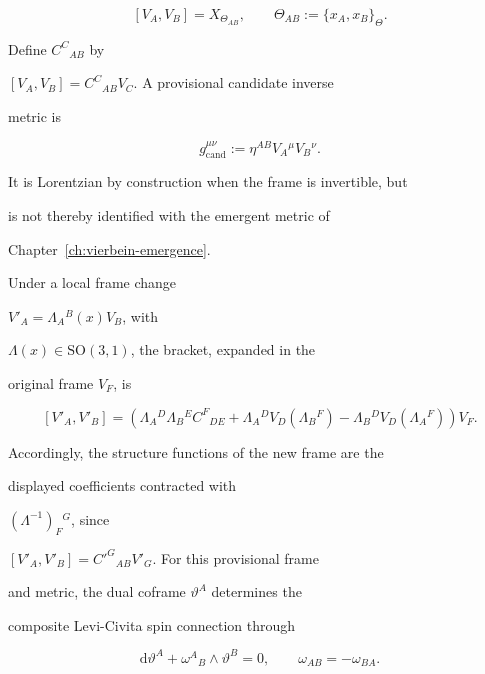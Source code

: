 \[

  [V_A,V_B]=X_{\Theta_{AB}},

  \qquad

  \Theta_{AB}:=\{x_A,x_B\}_\Theta .

\]

Define \(C^C{}_{AB}\) by

\([V_A,V_B]=C^C{}_{AB}V_C\). A provisional candidate inverse

metric is

\[

  g_{\mathrm{cand}}^{\mu\nu}

  :=\eta^{AB}V_A{}^\mu V_B{}^\nu .

\]

It is Lorentzian by construction when the frame is invertible, but

is not thereby identified with the emergent metric of

Chapter~\ref{ch:vierbein-emergence}.



Under a local frame change

\(V'_A=\Lambda_A{}^B(x)V_B\), with

\(\Lambda(x)\in\mathrm{SO}(3,1)\), the bracket, expanded in the

original frame \(V_F\), is

\[

  [V'_A,V'_B]

  =

  \left(

    \Lambda_A{}^D\Lambda_B{}^E C^F{}_{DE}

    +\Lambda_A{}^D V_D(\Lambda_B{}^F)

    -\Lambda_B{}^D V_D(\Lambda_A{}^F)

  \right)V_F .

\]

Accordingly, the structure functions of the new frame are the

displayed coefficients contracted with

\((\Lambda^{-1})_F{}^G\), since

\([V'_A,V'_B]=C'^G{}_{AB}V'_G\). For this provisional frame

and metric, the dual coframe \(\vartheta^A\) determines the

composite Levi-Civita spin connection through

\[

  \mathrm{d}\vartheta^A+\omega^A{}_B\wedge\vartheta^B=0,

  \qquad

  \omega_{AB}=-\omega_{BA}.

\]

